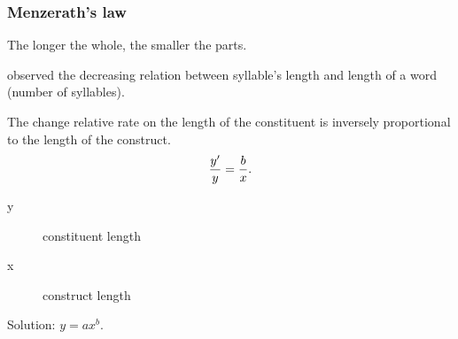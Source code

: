 \documentclass[notes]{beamer}
\begin{document}
\frame
{
  \frametitle{Menzerath's law}
  The longer the whole, the smaller the parts.

  \cite{menzerath1928} observed the decreasing relation between syllable's length and length of a word (number of syllables).

  \vspace{0.3cm}
  The change relative rate on the length of the constituent is inversely proportional to the length of the construct.
  \begin{equation}
  \frac{y'}{y} = \frac{b}{x} \textmd{.}
  \end{equation}
  \begin{description}
  \item[y] constituent length 
  \item[x] construct length
  \end{description}
  Solution: $y = a x^b$. 

}
\end{document}
